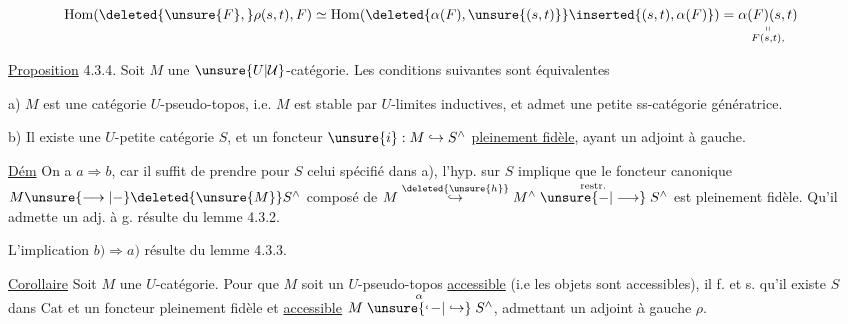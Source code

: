 \[
\begin{aligned}
\mathrm{Hom}(\deleted{\unsure{F},}\rho(s,t),F)&\simeq\mathrm{Hom}(\deleted{\alpha(F),\unsure{(s,t)}}\inserted{(s,t),\alpha(F)})=\underset{\substack{\shortparallel\\F(s,t),}}{\alpha(F)(s,t)}
\end{aligned}
\]




\uline{Proposition} 4.3.4. Soit $M$ une $\unsure{U|\mathcal U}$-catégorie. Les conditions suivantes sont équivalentes

a) $M$ est une catégorie $U$-pseudo-topos, i.e. $M$ est stable par $U$-limites inductives, et admet une petite ss-catégorie  génératrice.

b) Il existe une  $U$-petite catégorie $S$, et un foncteur $\unsure{i}:M\hookrightarrow S^\wedge$ \uline{pleinement fidèle}, ayant un adjoint à gauche.

\uline{Dém} On a $a\Rightarrow b$, car il suffit de prendre pour $S$  celui spécifié dans a), l'hyp. sur $S$ implique que le foncteur canonique $M\unsure{\longrightarrow|-}\deleted{\unsure{M}}S^\wedge$ composé de $M\mathrel{\mathop{\hookrightarrow}\limits^{\deleted{\unsure{h}}}}M^\wedge\mathrel{\mathop{\unsure{-|\longrightarrow}}\limits^{\mathrm{restr.}}}S^\wedge$ est pleinement fidèle. Qu'il admette un adj. à g. résulte du lemme 4.3.2.

L'implication $b)\Rightarrow a)$ résulte du lemme 4.3.3.

\uline{Corollaire}  Soit $M$ une $U$-catégorie. Pour que $M$ soit un $U$-pseudo-topos \deleted{\unsure{$\zeta|\xi$}} \uline{accessible} (i.e   les objets sont accessibles), il f. et s. qu'il existe $S$ dans $\mathrm{Cat}$ et un foncteur pleinement fidèle et \uline{accessible} $M\mathrel{\mathop{\unsure{\lhook\joinrel-|\hookrightarrow}}\limits^\alpha}S^\wedge$, admettant un adjoint à gauche $\rho$.

